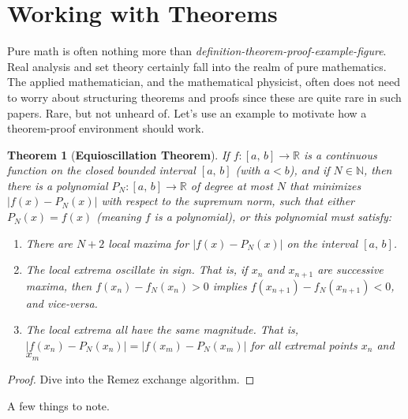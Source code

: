 \documentclass{article}
\theoremstyle{normal}
\newtheorem{theorem}{Theorem}
\begin{document}
    \section{Working with Theorems}
        Pure math is often nothing more than
        \textit{definition-theorem-proof-example-figure}. Real analysis and
        set theory certainly fall into the realm of pure mathematics.
        The applied mathematician, and the mathematical physicist, often does
        not need to worry about structuring theorems and proofs since these
        are quite rare in such papers. Rare, but not unheard of. Let's use an
        example to motivate how a theorem-proof environment should work.
        \begin{theorem}[\textbf{Equioscillation Theorem}]
            If $f:[a,\,b]\rightarrow\mathbb{R}$ is a continuous function on the
            closed bounded interval $[a,\,b]$ (with $a<b$), and if
            $N\in\mathbb{N}$, then there is a polynomial
            $P_{N}:[a,\,b]\rightarrow\mathbb{R}$ of degree at most $N$ that
            minimizes $|f(x)-P_{N}(x)|$ with respect to the supremum norm,
            such that either $P_{N}(x)=f(x)$ (meaning $f$ is a polynomial),
            or this polynomial must satisfy:
            \begin{enumerate}
                \item
                    There are $N+2$ local maxima for $|f(x)-P_{N}(x)|$
                    on the interval $[a,\,b]$.
                \item
                    The local extrema oscillate in sign. That is, if
                    $x_{n}$ and $x_{n+1}$ are successive maxima, then
                    $f(x_{n})-f_{N}(x_{n})>0$ implies
                    $f(x_{n+1})-f_{N}(x_{n+1})<0$, and vice-versa.
                \item
                    The local extrema all have the same magnitude. That is,
                    $|f(x_{n})-P_{N}(x_{n})|=|f(x_{m})-P_{N}(x_{m})|$ for all
                    extremal points $x_{n}$ and $x_{m}$
            \end{enumerate}
        \end{theorem}
        \begin{proof}
            Dive into the Remez exchange algorithm.
        \end{proof}
        A few things to note.
\end{document}
